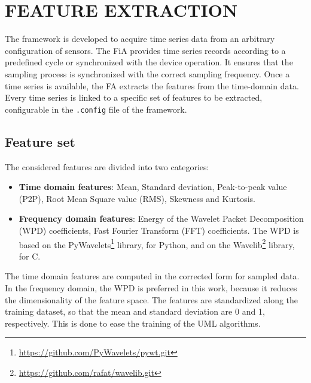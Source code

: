 \section{FEATURE EXTRACTION}
The framework is developed to acquire time series data from an arbitrary configuration of sensors. The FiA provides time series records according to a predefined cycle or synchronized with the device operation. It ensures that the sampling process is synchronized with the correct sampling frequency. Once a time series is available, the FA extracts the features from the time-domain data. Every time series is linked to a specific set of features to be extracted, configurable in the \texttt{.config} file of the framework.

\subsection{Feature set}
The considered features are divided into two categories:
\begin{itemize}
    \item \textbf{Time domain features}: Mean, Standard deviation, Peak-to-peak value (P2P), Root Mean Square value (RMS), Skewness and Kurtosis.
    \item \textbf{Frequency domain features}: Energy of the Wavelet Packet Decomposition (WPD) coefficients, Fast Fourier Transform (FFT) coefficients. The WPD is based on the PyWavelets\footnote{\url{https://github.com/PyWavelets/pywt.git}} library, for Python, and on the Wavelib\footnote{\url{https://github.com/rafat/wavelib.git}} library, for C.
\end{itemize}

The time domain features are computed in the corrected form for sampled data. In the frequency domain, the WPD is preferred in this work, because it reduces the dimensionality of the feature space. The features are standardized along the training dataset, so that the mean and standard deviation are 0 and 1, respectively. This is done to ease the training of the UML algorithms.

